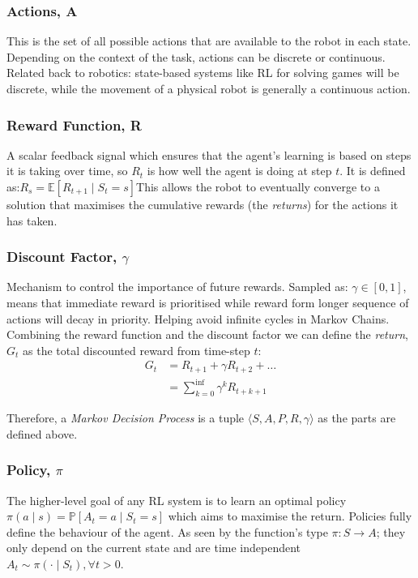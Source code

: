   \subsubsection{Actions, A}
    This is the set of all possible actions that are available to the robot in each state. Depending on the context of the task, actions can be discrete or continuous. Related back to robotics: state-based systems like RL for solving games will be discrete, while the movement of a physical robot is generally a continuous action.

  \subsubsection{Reward Function, R}
    A scalar feedback signal which ensures that the agent's learning is based on steps it is taking over time, so $R_t$ is how well the agent is doing at step $t$. It is defined as:\(R_s = \mathbb{E} \left[R_{t+1} \mid S_t = s\right]\)This allows the robot to eventually converge to a solution that maximises the cumulative rewards (the \emph{returns}) for the actions it has taken. 
  
  \subsubsection{Discount Factor, $\gamma$}
    Mechanism to control the importance of future rewards. Sampled as: \(\gamma \in \left[0, 1\right]\), means that immediate reward is prioritised while reward form longer sequence of actions will decay in priority. Helping avoid infinite cycles in Markov Chains. Combining the reward function and the discount factor we can define the \emph{return}, $G_t$ as the total discounted reward from time-step $t$:
    \[ 
    \begin{aligned}
      G_t &= R_{t+1} + \gamma R_{t+2} + \ldots \\ 
      &= \sum_{k=0}^{\inf}\gamma^k R_{t+k+1} 
    \end{aligned}
    \]
    
    Therefore, a \emph{Markov Decision Process} is a tuple \(\langle S, A, P, R, \gamma \rangle\) as the parts are defined above.
    
  \subsubsection{Policy, $\pi$}
    The higher-level goal of any RL system is to learn an optimal policy \(\pi \left( a \mid s\right) = \mathbb{P} \left[A_t = a \mid S_t = s\right]\) which aims to maximise the return. Policies fully define the behaviour of the agent. As seen by the function's type \(\pi: S \rightarrow A \); they only depend on the current state and are time independent \( A_t \sim \pi\left( \cdot \mid S_t\right), \forall t > 0 \).
    
